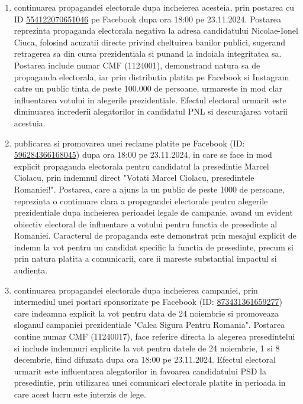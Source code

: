 \documentclass[a4paper,12pt]{article}
\begin{document}
\begin{enumerate}[leftmargin=*, label=\arabic*.)]
    \item continuarea propagandei electorale dupa incheierea acesteia, prin postarea cu ID \href{https://www.facebook.com/ads/library/?id=554122070651046}{554122070651046} pe Facebook dupa ora 18:00 pe 23.11.2024. Postarea reprezinta propaganda electorala negativa la adresa candidatului Nicolae-Ionel Ciuca, folosind acuzatii directe privind cheltuirea banilor publici, sugerand retragerea sa din cursa prezidentiala si punand la indoiala integritatea sa. Postarea include numar CMF (1124001), demonstrand natura sa de propaganda electorala, iar prin distributia platita pe Facebook si Instagram catre un public tinta de peste 100.000 de persoane, urmareste in mod clar influentarea votului in alegerile prezidentiale. Efectul electoral urmarit este diminuarea increderii alegatorilor in candidatul PNL si descurajarea votarii acestuia.
    \item publicarea si promovarea unei reclame platite pe Facebook (ID: \href{https://www.facebook.com/ads/library/?id=596284366168045}{596284366168045}) dupa ora 18:00 pe 23.11.2024, in care se face in mod explicit propaganda electorala pentru candidatul la presedintie Marcel Ciolacu, prin indemnul direct "Votati Marcel Ciolacu, presedintele Romaniei!". Postarea, care a ajuns la un public de peste 1000 de persoane, reprezinta o continuare clara a propagandei electorale pentru alegerile prezidentiale dupa incheierea perioadei legale de campanie, avand un evident obiectiv electoral de influentare a votului pentru functia de presedinte al Romaniei. Caracterul de propaganda este demonstrat prin mesajul explicit de indemn la vot pentru un candidat specific la functia de presedinte, precum si prin natura platita a comunicarii, care ii mareste substantial impactul si audienta.
    \item continuarea propagandei electorale dupa incheierea campaniei, prin intermediul unei postari sponsorizate pe Facebook (ID: \href{https://www.facebook.com/ads/library/?id=873431361659277}{873431361659277}) care indeamna explicit la vot pentru data de 24 noiembrie si promoveaza sloganul campaniei prezidentiale "Calea Sigura Pentru Romania". Postarea contine numar CMF (11240017), face referire directa la alegerea presedintelui si include indemnuri explicite la vot pentru datele de 24 noiembrie, 1 si 8 decembrie, fiind difuzata dupa ora 18:00 pe 23.11.2024. Efectul electoral urmarit este influentarea alegatorilor in favoarea candidatului PSD la presedintie, prin utilizarea unei comunicari electorale platite in perioada in care acest lucru este interzis de lege.

\end{enumerate}
\end{document}

